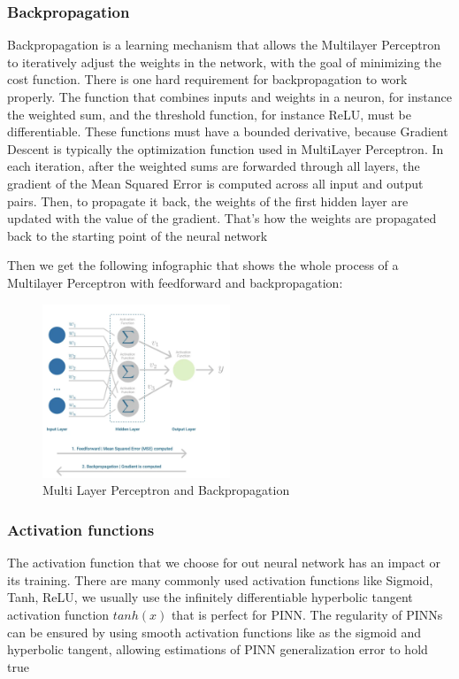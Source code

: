 \documentclass{article}
\begin{document}
\subsubsection{Backpropagation}

Backpropagation is a learning mechanism that allows the Multilayer Perceptron to iteratively adjust the weights in the network, with the goal of minimizing the cost function.
There is one hard requirement for backpropagation to work properly. The function that combines inputs and weights in a neuron, for instance the weighted sum, and the threshold function, for instance ReLU, must be differentiable. These functions must have a bounded derivative, because Gradient Descent is typically the optimization function used in MultiLayer Perceptron.
In each iteration, after the weighted sums are forwarded through all layers, the gradient of the Mean Squared Error is computed across all input and output pairs. Then, to propagate it back, the weights of the first hidden layer are updated with the value of the gradient. That’s how the weights are propagated back to the starting point of the neural network

Then we get the following infographic that shows the whole process of a Multilayer Perceptron with feedforward and backpropagation:

\begin{figure}[H]
    \centering
    \includegraphics[width=0.5\textwidth]{images/MLP2.png}
    \caption{Multi Layer Perceptron and Backpropagation}
\end{figure}

\subsubsection{Activation functions}

The activation function that we choose for out neural network has an impact or its training. There are many commonly used activation functions like Sigmoid, Tanh, ReLU, we usually use the infinitely differentiable hyperbolic tangent activation function $tanh(x)$ that is perfect for 
PINN. The regularity of PINNs can be ensured by using smooth activation functions like as the sigmoid and hyperbolic tangent, allowing estimations of PINN generalization error to hold true
\end{document}
